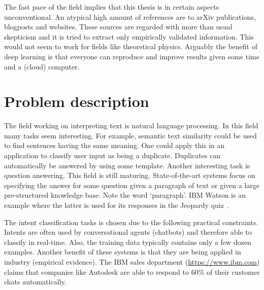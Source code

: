 The fast pace of the field implies that this thesis is in certain aspects unconventional.
An atypical high amount of references are to arXiv publications, blogposts and websites.
These sources are regarded with more than usual skepticism and it is tried to extract only empirically validated information.
This would not seem to work for fields like theoretical physics.
Arguably the benefit of deep learning is that everyone can reproduce and improve results given some time and a (cloud) computer.

\section{Problem description}
\label{sec:problem_description}
The field working on interpreting text is natural language processing.
In this field many tasks seem interesting.
For example, semantic text similarity could be used to find sentences having the same meaning.
One could apply this in an application to classify user input as being a duplicate.
Duplicates can automatically be answered by using some template.
Another interesting task is question answering.
This field is still maturing.
State-of-the-art systems focus on specifying the answer for some question given a paragraph of text or given a large pre-structured knowledge base.
Note the word `paragraph'.
IBM Watson is an example where the latter is used for its responses in the Jeopardy quiz~\citep{high2012era}.

The intent classification tasks is chosen due to the following practical constraints.
Intents are often used by conversational agents (chatbots) and therefore able to classify in real-time.
Also, the training data typically contains only a few dozen examples.
Another benefit of these systems is that they are being applied in industry (empirical evidence).
The IBM sales department (\url{https://www.ibm.com}) claims that companies like Autodesk are able to respond to 60\% of their customer chats automatically.

